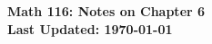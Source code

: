 \documentclass[11pt,letterpaper]{article}
\begin{document}
\flushleft
\begin{multicols}{2}


\begin{large}\textbf{Math 116: Notes on Chapter 6 \\ 
Last Updated: \today
}\end{large}


\vspace{.5in}

\end{multicols}

\pagestyle{empty}


\flushleft

\end{document}
